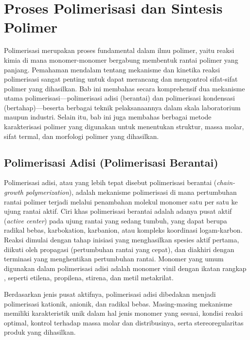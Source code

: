 \documentclass[12pt,a4paper,openany]{book}
\begin{document}
\chapter{Proses Polimerisasi dan Sintesis Polimer}

Polimerisasi merupakan proses fundamental dalam ilmu polimer, yaitu reaksi kimia di mana monomer-monomer bergabung membentuk rantai polimer yang panjang. Pemahaman mendalam tentang mekanisme dan kinetika reaksi polimerisasi sangat penting untuk dapat merancang dan mengontrol sifat-sifat polimer yang dihasilkan. Bab ini membahas secara komprehensif dua mekanisme utama polimerisasi---polimerisasi adisi (berantai) dan polimerisasi kondensasi (bertahap)---beserta berbagai teknik pelaksanaannya dalam skala laboratorium maupun industri. Selain itu, bab ini juga membahas berbagai metode karakterisasi polimer yang digunakan untuk menentukan struktur, massa molar, sifat termal, dan morfologi polimer yang dihasilkan.

\section{Polimerisasi Adisi (Polimerisasi Berantai)}

Polimerisasi adisi, atau yang lebih tepat disebut polimerisasi berantai (\textit{chain-growth polymerization}), adalah mekanisme polimerisasi di mana pertumbuhan rantai polimer terjadi melalui penambahan molekul monomer satu per satu ke ujung rantai aktif. Ciri khas polimerisasi berantai adalah adanya pusat aktif (\textit{active center}) pada ujung rantai yang sedang tumbuh, yang dapat berupa radikal bebas, karbokation, karbanion, atau kompleks koordinasi logam-karbon. Reaksi dimulai dengan tahap inisiasi yang menghasilkan spesies aktif pertama, diikuti oleh propagasi (pertumbuhan rantai yang cepat), dan diakhiri dengan terminasi yang menghentikan pertumbuhan rantai. Monomer yang umum digunakan dalam polimerisasi adisi adalah monomer vinil dengan ikatan rangkap , seperti etilena, propilena, stirena, dan metil metakrilat.

Berdasarkan jenis pusat aktifnya, polimerisasi adisi dibedakan menjadi polimerisasi kationik, anionik, dan radikal bebas. Masing-masing mekanisme memiliki karakteristik unik dalam hal jenis monomer yang sesuai, kondisi reaksi optimal, kontrol terhadap massa molar dan distribusinya, serta stereoregularitas produk yang dihasilkan.
\end{document}
